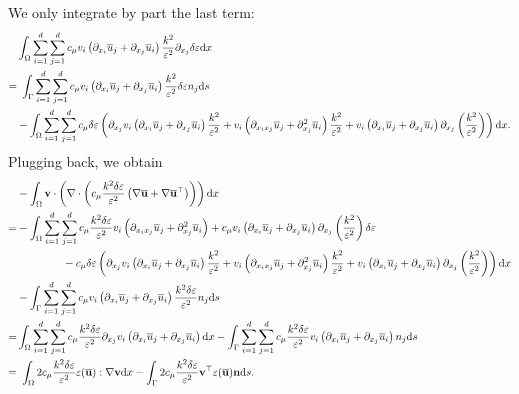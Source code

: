 \documentclass[oneside,11pt]{book}
\numberwithin{equation}{section}
\begin{document}
We only integrate by part the last term:
\begin{align*}
    &\int_\Omega \sum_{i=1}^d\sum_{j=1}^d c_\mu v_i\left(\partial_{x_i}\overline{u}_j + \partial_{x_j}\overline{u}_i\right)\frac{k^2}{\varepsilon^2}\partial_{x_j}\delta\varepsilon{\rm d}x\\
    =&\ \int_\Gamma \sum_{i=1}^d\sum_{j=1}^d c_\mu v_i\left(\partial_{x_i}\overline{u}_j + \partial_{x_j}\overline{u}_i\right)\frac{k^2}{\varepsilon^2}\delta\varepsilon n_j{\rm d}s\\
    &-\int_\Omega \sum_{i=1}^d\sum_{j=1}^d c_\mu\delta\varepsilon\left(\partial_{x_j}v_i\left(\partial_{x_i}\overline{u}_j + \partial_{x_j}\overline{u}_i\right)\frac{k^2}{\varepsilon^2} + v_i\left(\partial_{x_ix_j}\overline{u}_j + \partial_{x_j}^2\overline{u}_i\right)\frac{k^2}{\varepsilon^2} + v_i\left(\partial_{x_i}\overline{u}_j + \partial_{x_j}\overline{u}_i\right)\partial_{x_j}\left(\frac{k^2}{\varepsilon^2}\right)\right){\rm d}x.
\end{align*}
Plugging back, we obtain
\begin{align*}
    &-\int_\Omega {\bf v}\cdot\left(\nabla\cdot\left(c_\mu\frac{k^2\delta\varepsilon}{\varepsilon^2}\left(\nabla\overline{\bf u} + \nabla\overline{\bf u}^\top\right)\right)\right){\rm d}x\\
    =&-\int_\Omega \sum_{i=1}^d\sum_{j=1}^d c_\mu\frac{k^2\delta\varepsilon}{\varepsilon^2}v_i\left(\partial_{x_ix_j}\overline{u}_j + \partial_{x_j}^2\overline{u}_i\right) + c_\mu v_i\left(\partial_{x_i}\overline{u}_j + \partial_{x_j}\overline{u}_i\right)\partial_{x_j}\left(\frac{k^2}{\varepsilon^2}\right)\delta\varepsilon\\
    &\hspace{1.5cm} -c_\mu\delta\varepsilon\left(\partial_{x_j}v_i\left(\partial_{x_i}\overline{u}_j + \partial_{x_j}\overline{u}_i\right)\frac{k^2}{\varepsilon^2} + v_i\left(\partial_{x_ix_j}\overline{u}_j + \partial_{x_j}^2\overline{u}_i\right)\frac{k^2}{\varepsilon^2} + v_i\left(\partial_{x_i}\overline{u}_j + \partial_{x_j}\overline{u}_i\right)\partial_{x_j}\left(\frac{k^2}{\varepsilon^2}\right)\right){\rm d}x\\
    &-\int_\Gamma \sum_{i=1}^d\sum_{j=1}^d c_\mu v_i\left(\partial_{x_i}\overline{u}_j + \partial_{x_j}\overline{u}_i\right)\frac{k^2\delta\varepsilon}{\varepsilon^2}n_j{\rm d}s\\
    =& \int_\Omega \sum_{i=1}^d\sum_{j=1}^d c_\mu\frac{k^2\delta\varepsilon}{\varepsilon^2}\partial_{x_j}v_i\left(\partial_{x_i}\overline{u}_j + \partial_{x_j}\overline{u}_i\right){\rm d}x - \int_\Gamma \sum_{i=1}^d\sum_{j=1}^d c_\mu\frac{k^2\delta\varepsilon}{\varepsilon^2}v_i\left(\partial_{x_i}\overline{u}_j + \partial_{x_j}\overline{u}_i\right)n_j{\rm d}s\\
    =&\ \int_\Omega 2c_\mu\frac{k^2\delta\varepsilon}{\varepsilon^2}\varepsilon(\overline{\bf u}):\nabla{\bf v}{\rm d}x - \int_\Gamma 2c_\mu\frac{k^2\delta\varepsilon}{\varepsilon^2}{\bf v}^\top\varepsilon(\overline{\bf u}){\bf n}{\rm d}s.
\end{align*}
\end{document}
